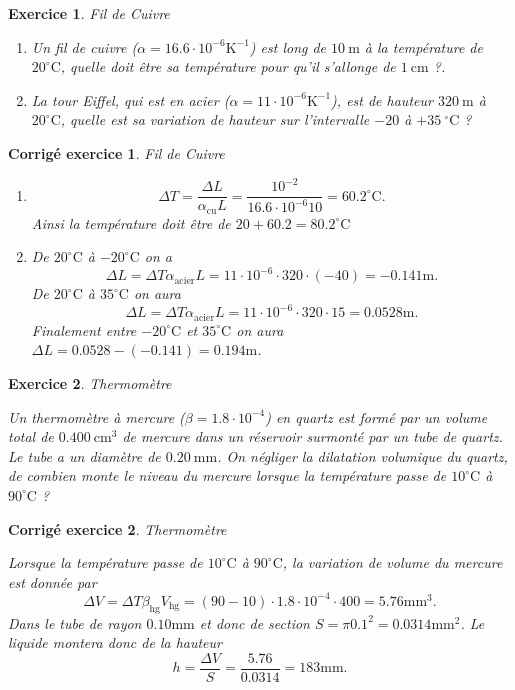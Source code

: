 \documentclass[a4paper,12pt]{article}
\newtheorem{exercice}{Exercice}
\newtheorem{corrige}{Corrig\'e exercice}
\newcommand{\cm}{\mathrm{cm}}
\newcommand{\mm}{\mathrm{mm}}
\newcommand{\m}{\mathrm{m}}
\newcommand{\K}{\mathrm{K}}
\newcommand{\C}{\mathrm{C}}
\newcommand{\oC}{^\circ\C}
\begin{document}
\begin{exercice}{Fil de Cuivre}

\begin{enumerate}
	\item Un fil de cuivre ($\alpha=16.6\cdot 10^{-6}\K^{-1}$) est long de $10\ \m$ à la température de $20\oC$, quelle doit être sa
température pour qu'il s'allonge de $1\ \cm$ ?.
	\item La tour Eiffel, qui est en acier ($\alpha=11\cdot 10^{-6}\K^{-1}$), est de hauteur $320\ \m$ à $20\oC$, quelle est sa variation de hauteur
sur l’intervalle $-20$ à $+35\ \oC$ ?
\end{enumerate}
\end{exercice}

\begin{corrige}{Fil de Cuivre}
\begin{enumerate}
	\item 
\begin{equation}
\Delta T=\frac{\Delta L}{\alpha_\mathrm{cu}L}=\frac{10^{-2}}{16.6\cdot10^{-6}10}=60.2^\circ\C.
\end{equation}
Ainsi la température doit être de $20+60.2=80.2^\circ\C$
\item De $20\oC$ à $-20\oC$ on a 
\begin{equation}
\Delta L=\Delta T \alpha_\mathrm{acier}L=11\cdot10^{-6}\cdot 320\cdot(-40)=-0.141\m.
\end{equation}
De $20\oC$ à $35\oC$ on aura
\begin{equation}
\Delta L=\Delta T \alpha_\mathrm{acier}L=11\cdot10^{-6}\cdot 320\cdot15=0.0528\m.
\end{equation}
Finalement entre $-20\oC$ et $35\oC$ on aura $\Delta L=0.0528-(-0.141)=0.194\m$.
\end{enumerate}
\end{corrige}

\begin{exercice}{Thermomètre}

Un thermomètre à mercure ($\beta=1.8\cdot 10^{-4}$) en quartz est formé par un volume total de $0.400\ \cm^3$ de mercure
dans un réservoir surmonté par un tube de quartz. Le tube a un diamètre de $0.20\ \mm$.
On négliger la dilatation volumique du quartz, de combien monte le niveau du mercure
lorsque la température passe de $10\oC$ à $90\oC$ ?
\end{exercice}

\begin{corrige}{Thermomètre}

Lorsque la température passe de $10\oC$ à $90\oC$, la variation de volume du mercure est donnée par 
\begin{equation}
\Delta V=\Delta T \beta_\mathrm{hg}V_\mathrm{hg}=(90-10)\cdot 1.8\cdot 10^{-4}\cdot 400=5.76\mm^3.
\end{equation}
Dans le tube de rayon $0.10\mm$ et donc de section $S=\pi 0.1^2=0.0314\mm^2$.
Le liquide montera donc de la hauteur  
\begin{equation}
h=\frac{\Delta V}{S}=\frac{5.76}{0.0314}=183\mm.
\end{equation}

\end{corrige}
\end{document}
